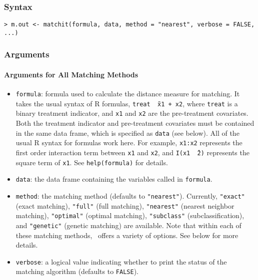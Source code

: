 \subsubsection{Syntax}
\begin{verbatim}
> m.out <- matchit(formula, data, method = "nearest", verbose = FALSE, ...)
\end{verbatim}

\subsubsection{Arguments}

\paragraph{Arguments for All Matching Methods}

\begin{itemize}

\item \texttt{formula}: formula used to calculate the distance measure
  for matching.  It takes the usual syntax of R formulas, {\tt treat
    \~\ x1 + x2}, where {\tt treat} is a binary treatment indicator,
  and {\tt x1} and {\tt x2} are the pre-treatment covariates. Both the
  treatment indicator and pre-treatment covariates must be contained
  in the same data frame, which is specified as {\tt data} (see
  below).  All of the usual R syntax for formulas work here. For
  example, {\tt x1:x2} represents the first order interaction term
  between {\tt x1} and {\tt x2}, and {\tt I(x1 \^\ 2)} represents the
  square term of {\tt x1}. See {\tt help(formula)} for details.
  
\item \texttt{data}: the data frame containing the variables called in
  {\tt formula}.  
  
\item \texttt{method}: the matching method (defaults to \texttt{"nearest"}).
  Currently, \texttt{"exact"} (exact matching), \texttt{"full"} (full
  matching), \texttt{"nearest"} (nearest neighbor matching),
  \texttt{"optimal"} (optimal matching), \texttt{"subclass"}
  (subclassification), and \texttt{"genetic"} (genetic matching) are
  available. Note that within each of these matching methods,
  \MatchIt\ offers a variety of options.  See below
  for more details.

\item \texttt{verbose}: a logical value indicating whether to print
the status of the matching algorithm (defaults to \texttt{FALSE}). 
\end{itemize}


